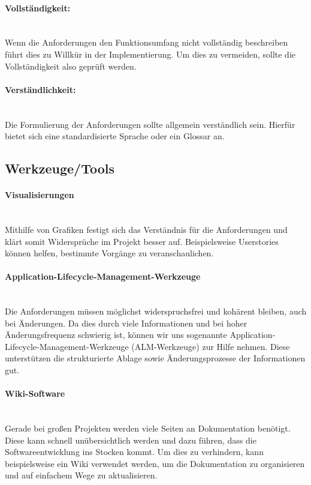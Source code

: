 \documentclass[a4paper, ngerman, 12pt, usenames, dvipsnames]{article}
\begin{document}
\paragraph{Vollständigkeit:}\mbox{} \\
Wenn die Anforderungen den Funktionsumfang nicht vollständig beschreiben führt dies zu Willkür in der Implementierung. Um dies zu vermeiden, sollte die Vollständigkeit also geprüft werden.
\paragraph{Verständlichkeit:}\mbox{} \\
Die Formulierung der Anforderungen sollte allgemein verständlich sein. Hierfür bietet sich eine standardisierte Sprache oder ein Glossar an.


\subsection{Werkzeuge/Tools}

\paragraph{Visualisierungen}\mbox{} \\
Mithilfe von Grafiken festigt sich das Verständnis für die Anforderungen und klärt somit Widersprüche im Projekt besser auf. Beispielsweise Userstories können helfen, bestimmte Vorgänge zu veranschaulichen.
\paragraph{Application-Lifecycle-Management-Werkzeuge}\mbox{} \\
Die Anforderungen müssen möglichst widerspruchsfrei und kohärent bleiben, auch bei Änderungen. Da dies durch viele Informationen und bei hoher Änderungsfrequenz schwierig ist, können wir uns sogenannte Application-Lifecycle-Management-Werkzeuge (ALM-Werkzeuge) zur Hilfe nehmen. Diese unterstützen die strukturierte Ablage sowie Änderungsprozesse der Informationen gut.
\paragraph{Wiki-Software}\mbox{} \\
Gerade bei großen Projekten werden viele Seiten an Dokumentation benötigt. Diese kann schnell unübersichtlich werden und dazu führen, dass die Softwareentwicklung ins Stocken kommt. Um dies zu verhindern, kann beispielsweise ein Wiki verwendet werden, um die Dokumentation zu organisieren und auf einfachem Wege zu aktualisieren.
\end{document}
